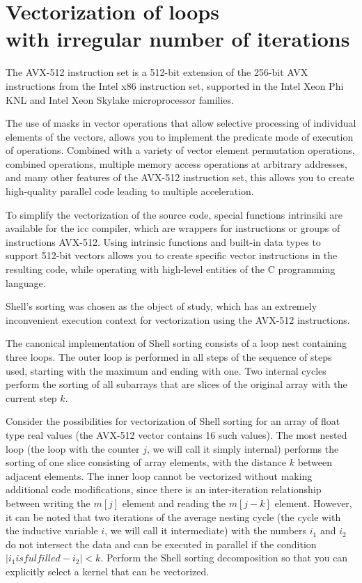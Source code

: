 \documentclass[
11pt,%
tightenlines,%
twoside,%
onecolumn,%
nofloats,%
nobibnotes,%
nofootinbib,%
superscriptaddress,%
noshowpacs,%
centertags]%
{revtex4}
\begin{document}
\section{Vectorization of loops \protect\\
with irregular number of iterations}

The AVX-512 instruction set is a 512-bit extension of the 256-bit AVX instructions from the Intel x86 instruction set, supported in the Intel Xeon Phi KNL and Intel Xeon Skylake microprocessor families.

The use of masks in vector operations that allow selective processing of individual elements of the vectors, allows you to implement the predicate mode of execution of operations. Combined with a variety of vector element permutation operations, combined operations, multiple memory access operations at arbitrary addresses, and many other features of the AVX-512 instruction set, this allows you to create high-quality parallel code leading to multiple acceleration.

To simplify the vectorization of the source code, special functions intrinsiki are available for the icc compiler, which are wrappers for instructions or groups of instructions AVX-512. Using intrinsic functions and built-in data types to support 512-bit vectors allows you to create specific vector instructions in the resulting code, while operating with high-level entities of the C programming language.

Shell's sorting was chosen as the object of study, which has an extremely inconvenient execution context for vectorization using the AVX-512 instructions.

The canonical implementation of Shell sorting consists of a loop nest containing three loops. The outer loop is performed in all steps of the sequence of steps used, starting with the maximum and ending with one. Two internal cycles perform the sorting of all subarrays that are slices of the original array with the current step $ k $.

Consider the possibilities for vectorization of Shell sorting for an array of float type real values ​​(the AVX-512 vector contains 16 such values). The most nested loop (the loop with the counter $ j $, we will call it simply internal) performs the sorting of one slice consisting of array elements, with the distance $ k $ between adjacent elements.
The inner loop cannot be vectorized without making additional code modifications, since there is an inter-iteration relationship between writing the $ m [j] $ element and reading the $ m [j - k] $ element. However, it can be noted that two iterations of the average nesting cycle (the cycle with the inductive variable $ i $, we will call it intermediate) with the numbers $ i_1 $ and $ i_2 $ do not intersect the data and can be executed in parallel if the condition $ | i_1 is fulfilled - i_2 | <k $. Perform the Shell sorting decomposition so that you can explicitly select a kernel that can be vectorized.
\end{document}
